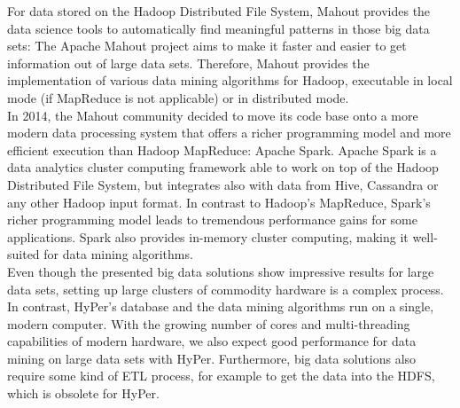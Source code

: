For data stored on the Hadoop Distributed File System, Mahout provides the data science tools to automatically find meaningful patterns in those big data sets: The Apache Mahout project aims to make it faster and easier to get information out of large data sets.
Therefore, Mahout provides the implementation of various data mining algorithms for Hadoop, executable in local mode (if MapReduce is not applicable) or in distributed mode. 
\\
In 2014, the Mahout community decided to move its code base onto a more modern data processing system that offers a richer programming model and more efficient execution than Hadoop MapReduce: Apache Spark. Apache Spark is a data analytics cluster computing framework able to work on top of the Hadoop Distributed File System, but integrates also with data from Hive, Cassandra or any other Hadoop input format. In contrast to Hadoop’s MapReduce, Spark's richer programming model leads to tremendous performance gains for some applications. Spark also provides in-memory cluster computing, making it well-suited for data mining algorithms. 
\\
Even though the presented big data solutions show impressive results for large data sets, setting up large clusters of commodity hardware is a complex process. In contrast, HyPer's database and the data mining algorithms run on a single, modern computer. With the growing number of cores and multi-threading capabilities of modern hardware, we also expect good performance for data mining on large data sets with HyPer. Furthermore, big data solutions also require some kind of ETL process, for example to get the data into the HDFS, which is obsolete for HyPer.




